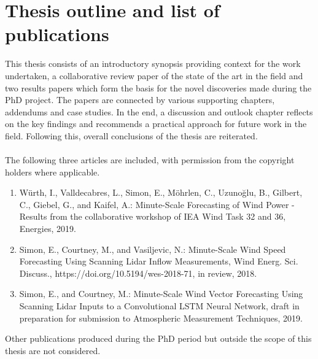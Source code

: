 \chapter{Thesis outline and list of publications}
\label{sec:outline}


This thesis consists of an introductory synopsis providing context for the work undertaken, a collaborative review paper of the state of the art in the field and two results papers which form the basis for the novel discoveries made during the PhD project. The papers are connected by various supporting chapters, addendums and case studies. In the end, a discussion and outlook chapter reflects on the key findings and recommends a practical approach for future work in the field. Following this, overall conclusions of the thesis are reiterated.
\\\\
The following three articles are included, with permission from the copyright holders where applicable.
\\
\begin{enumerate}
    \item W\"urth, I., Valldecabres, L., Simon, E., M\"ohrlen, C., Uzuno\u glu, B., Gilbert, C., Giebel, G., and Kaifel, A.: Minute-Scale Forecasting of Wind Power - Results from the collaborative workshop of IEA Wind Task 32 and 36, Energies, 2019.
    
    \item Simon, E., Courtney, M., and Vasiljevic, N.: Minute-Scale Wind Speed Forecasting Using Scanning Lidar Inflow Measurements, Wind Energ. Sci. Discuss., https://doi.org/10.5194/wes-2018-71, in review, 2018.
    
    \item Simon, E., and Courtney, M.: Minute-Scale Wind Vector Forecasting Using Scanning Lidar Inputs to a Convolutional LSTM Neural Network, draft in preparation for submission to Atmospheric Measurement Techniques, 2019.

\end{enumerate}

\noindent
Other publications produced during the PhD period but outside the scope of this thesis are not considered.